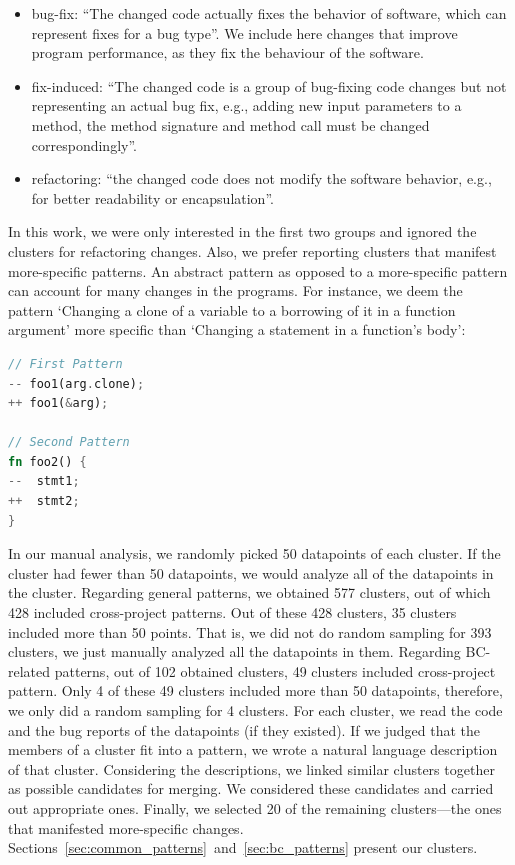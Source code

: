 \begin{itemize}
    \item bug-fix: ``The changed code actually fixes the behavior of software, which can represent fixes for a bug type''. We include here changes that improve program performance, as they fix the behaviour of the software.

    \item fix-induced: ``The changed code is a group of bug-fixing code changes but not representing an actual bug fix, e.g., adding new input parameters to a method, the method signature and method call must be changed correspondingly''.
    
    \item refactoring: ``the changed code does not modify the software behavior, e.g., for better readability or encapsulation''.
\end{itemize}

In this work, we were only interested in the first two groups and ignored the clusters for refactoring changes. Also, we prefer reporting clusters that manifest more-specific patterns. An abstract pattern as opposed to a more-specific pattern can account for many changes in the programs. For instance, we deem the pattern `Changing a clone of a variable to a borrowing of it in a function argument' more specific than `Changing a statement in a function's body':

\begin{lstlisting}[language=Rust, style=colouredRust]
// First Pattern
-- foo1(arg.clone);
++ foo1(&arg);

// Second Pattern
fn foo2() {
--  stmt1;
++  stmt2;
}

\end{lstlisting}


In our manual analysis, we randomly picked 50 datapoints of each cluster. If the cluster had fewer than 50 datapoints, we would analyze all of the datapoints in the cluster. Regarding general patterns, we obtained 577 clusters, out of which 428 included cross-project patterns. Out of these 428 clusters, 35 clusters included more than 50 points. That is, we did not do random sampling for 393 clusters, we just manually analyzed all the datapoints in them. Regarding BC-related patterns, out of 102 obtained clusters, 49 clusters included cross-project pattern. Only 4 of these 49 clusters included more than 50 datapoints, therefore, we only did a random sampling for 4 clusters. For each cluster, we read the code and the bug reports of the datapoints (if they existed). If we judged that the members of a cluster fit into a pattern, we wrote a natural language description of that cluster. Considering the descriptions, we linked similar clusters together as possible candidates for merging. We considered these candidates and carried out appropriate ones. Finally, we selected 20 of the remaining clusters---the ones that manifested more-specific changes. Sections~\ref{sec:common_patterns}~and~\ref{sec:bc_patterns} present our clusters.

